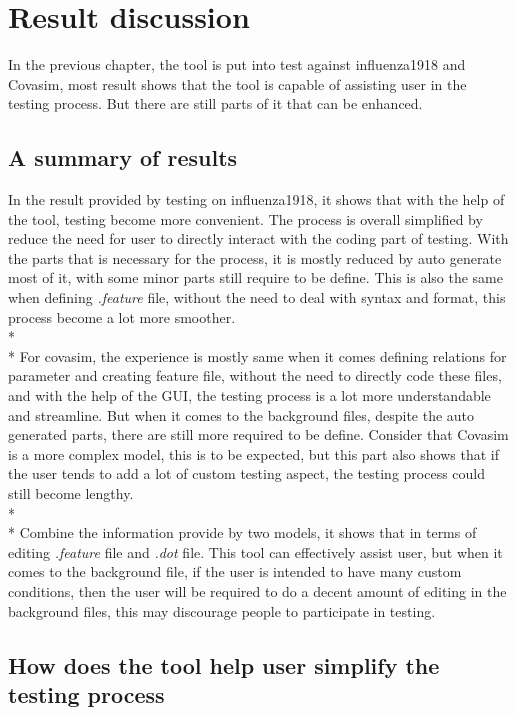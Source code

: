 \chapter{Result discussion}
In the previous chapter, the tool is put into test against influenza1918 and Covasim, most result shows that the tool is capable of assisting user in the testing process. But there are still parts of it that can be enhanced.
\section{A summary of results}
In the result provided by testing on influenza1918, it shows that with the help of the tool, testing become more convenient. The process is overall simplified by reduce the need for user to directly interact with the coding part of testing. With the parts that is necessary for the process, it is mostly reduced by auto generate most of it, with some minor parts still require to be define. This is also the same when defining \textsl{.feature} file, without the need to deal with syntax and format, this process become a lot more smoother. \\*\\*
For covasim, the experience is mostly same when it comes defining relations for parameter and creating feature file, without the need to directly code these files, and with the help of the GUI, the testing process is a lot more understandable and streamline. But when it comes to the background files, despite the auto generated parts, there are still more required to be define. Consider that Covasim is a more complex model, this is to be expected, but this part also shows that if the user tends to add a lot of custom testing aspect, the testing process could still become lengthy.\\*\\*
Combine the information provide by two models, it shows that in terms of editing \textsl{.feature} file and \textsl{.dot} file. This tool can effectively assist user, but when it comes to the background file, if the user is intended to have many custom conditions, then the user will be required to do a decent amount of editing in the background files, this may discourage people to participate in testing.
\section{How does the tool help user simplify the testing process}
